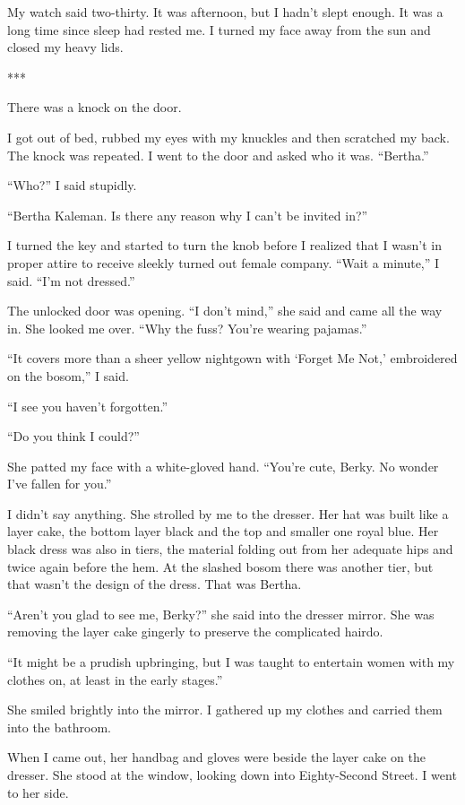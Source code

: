 \documentclass{novel}
\begin{document}
{My watch said two-thirty. It was afternoon, but I hadn’t slept enough. It was a long time since sleep had rested me. I turned my face away from the sun and closed my heavy lids.

***

There was a knock on the door.

I got out of bed, rubbed my eyes with my knuckles and then scratched my back. The knock was repeated. I went to the door and asked who it was. “Bertha.”

“Who?” I said stupidly.

“Bertha Kaleman. Is there any reason why I can’t be invited in?”

I turned the key and started to turn the knob before I realized that I wasn’t in proper attire to receive sleekly turned out female company. “Wait a minute,” I said. “I’m not dressed.”

The unlocked door was opening. “I don’t mind,” she said and came all the way in. She looked me over. “Why the fuss? You’re wearing pajamas.”

“It covers more than a sheer yellow nightgown with ‘Forget Me Not,’ embroidered on the bosom,” I said.

“I see you haven’t forgotten.”

“Do you think I could?”

She patted my face with a white-gloved hand. “You’re cute, Berky. No wonder I’ve fallen for you.”

I didn’t say anything. She strolled by me to the dresser. Her hat was built like a layer cake, the bottom layer black and the top and smaller one royal blue. Her black dress was also in tiers, the material folding out from her adequate hips and twice again before the hem. At the slashed bosom there was another tier, but that wasn’t the design of the dress. That was Bertha.

“Aren’t you glad to see me, Berky?” she said into the dresser mirror. She was removing the layer cake gingerly to preserve the complicated hairdo.

“It might be a prudish upbringing, but I was taught to entertain women with my clothes on, at least in the early stages.”

She smiled brightly into the mirror. I gathered up my clothes and carried them into the bathroom.

When I came out, her handbag and gloves were beside the layer cake on the dresser. She stood at the window, looking down into Eighty-Second Street. I went to her side.

}
\end{document}
